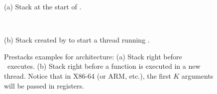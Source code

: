 \begin{figure}\centering
\begin{multicols}{2}
%
%

\vspace*{\fill}

\begin{drawstacknoends}
{}
\stackbottom[padding]
\end{drawstacknoends}

(a) Stack at the start of \main. 

\ 

\columnbreak

\vspace*{\fill}
\begin{drawstacknoends}
{}
\stackbottom[padding]
\end{drawstacknoends}

(b) Stack created by  to start a thread running . 

\end{multicols}
\caption[Prestacks examples for  architecture]{Prestacks examples for  architecture: (a) Stack right before \main\ executes. (b) Stack right before a function  is executed in a new thread. Notice that in X86-64 (or ARM, etc.), the first $K$ arguments will be passed in registers. }\label{figure:premain_stacks}
\end{figure}



